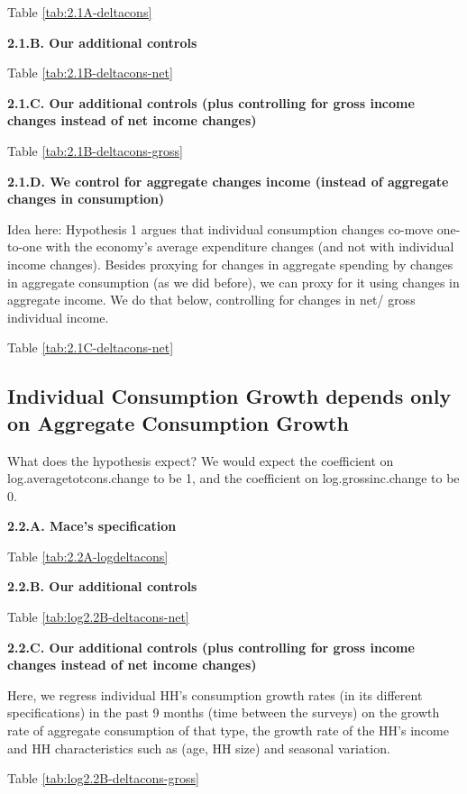 \documentclass[12pt,a4paper]{article}
\begin{document}
Table \ref{tab:2.1A-deltacons} 


\textbf{2.1.B. Our additional controls}

Table \ref{tab:2.1B-deltacons-net}


\textbf{2.1.C. Our additional controls (plus controlling for gross income changes instead of net income changes)}

Table \ref{tab:2.1B-deltacons-gross}


\textbf{2.1.D. We control for aggregate changes income (instead of aggregate changes in consumption)}

Idea here: Hypothesis 1 argues that individual consumption changes co-move one-to-one with the economy's average expenditure changes (and not with individual income changes). Besides proxying for changes in aggregate spending by changes in aggregate consumption (as we did before), we can proxy for it using changes in aggregate income. We do that below, controlling for changes in net/ gross individual income.

Table \ref{tab:2.1C-deltacons-net}


\subsection*{Individual Consumption Growth depends only on Aggregate Consumption Growth}
What does the hypothesis expect? We would expect the coefficient on log.averagetotcons.change to be 1, and the coefficient on log.grossinc.change to be 0.

\textbf{2.2.A. Mace's specification}

Table \ref{tab:2.2A-logdeltacons}


\textbf{2.2.B. Our additional controls}

Table \ref{tab:log2.2B-deltacons-net}


\textbf{2.2.C. Our additional controls (plus controlling for gross income changes instead of net income changes)}

Here, we regress individual HH's consumption growth rates (in its different specifications) in the past 9 months (time between the surveys) on the growth rate of aggregate consumption of that type, the growth rate of the HH's income and HH characteristics such as (age, HH size) and seasonal variation. 

Table \ref{tab:log2.2B-deltacons-gross}

\end{document}

